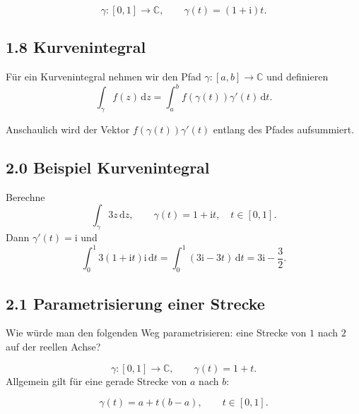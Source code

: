 \documentclass[11pt,a4paper]{article}
\newcommand{\C}{\mathbb C}
\newcommand{\ii}{\mathrm i}
\newcommand{\dd}{\,\mathrm d}
\begin{document}
\begin{center}
\end{center}

\begin{beispielbox}
\[
\gamma:[0,1]\to\C,
\qquad
\gamma(t)=(1+\ii)t.
\]
\end{beispielbox}

\subsection{1.8 Kurvenintegral}
\begin{importantbox}
Für ein Kurvenintegral nehmen wir den Pfad $\gamma:[a,b]\to\C$ und definieren
\[
\int_\gamma f(z)\dd z=\int_a^b f(\gamma(t))\gamma'(t)\dd t.
\]
\end{importantbox}
Anschaulich wird der Vektor $f(\gamma(t))\gamma'(t)$ entlang des Pfades aufsummiert.

\subsection{2.0 Beispiel Kurvenintegral}
\begin{beispielbox}
Berechne
\[
\int_\gamma 3z\dd z,
\qquad \gamma(t)=1+\ii t,
\quad t\in[0,1].
\]
Dann $\gamma'(t)=\ii$ und
\[
\int_0^1 3(1+\ii t)\ii\dd t=\int_0^1(3\ii-3t)\dd t=3\ii-\frac32.
\]
\end{beispielbox}

\subsection{2.1 Parametrisierung einer Strecke}
\begin{fragebox}
Wie würde man den folgenden Weg parametrisieren: eine Strecke von $1$ nach $2$ auf der reellen Achse?
\end{fragebox}
\begin{antwortbox}
\[
\gamma:[0,1]\to\C,
\qquad
\gamma(t)=1+t.
\]
Allgemein gilt für eine gerade Strecke von $a$ nach $b$:
\begin{importantbox}
\[
\gamma(t)=a+t(b-a),\qquad t\in[0,1].
\]
\end{importantbox}
\end{antwortbox}
\end{document}
